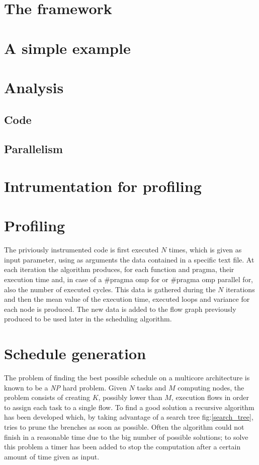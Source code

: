 \documentclass[a4paper,11pt,oneside]{book}
\begin{document}
\section{The framework}
\section{A simple example}
\section{Analysis}
\subsection{Code}
\subsection{Parallelism}
\section{Intrumentation for profiling}
\section{Profiling}

The priviously instrumented code is first executed $N$ times, which is given as input parameter, using as arguments the data contained in a specific text file. At each iteration the algorithm produces, for each function and pragma, their execution time and, in case of a $\#$pragma omp for or $\#$pragma omp parallel for, also the number of executed cycles. This data is gathered during the $N$ iterations and then the mean value of the execution time, executed loops and variance for each node is produced. The new data is  added to the flow graph previously produced to be used later in the scheduling algorithm.



\section{Schedule generation}

The problem of finding the best possible schedule on a multicore architecture is known to be a \emph{NP} hard problem. Given $N$ tasks and $M$ computing nodes, the problem consists of creating $K$, possibly lower than $M$, execution flows in order to assign each task to a single flow. To find a good solution a recursive algorithm has been developed which, by taking advantage of a search tree fig:\ref{search_tree}, tries to prune the brenches as soon as possible. Often the algorithm could not finish in a reasonable time due to the big number of possible solutions; to solve this problem a timer has been added to stop the computation after a certain amount of time given as input. \\
\end{document}
